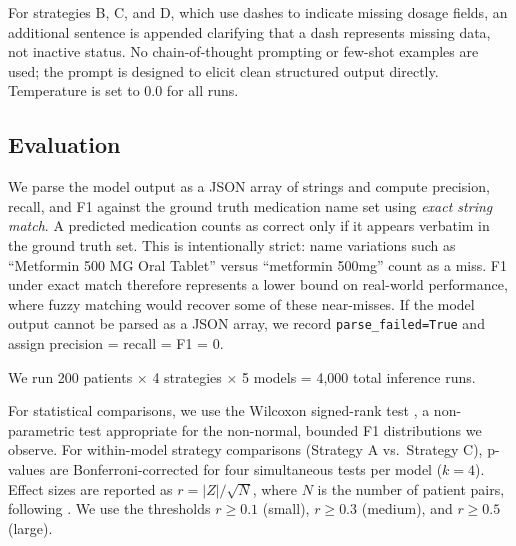 \noindent
For strategies B, C, and D, which use dashes to indicate missing dosage fields, an
additional sentence is appended clarifying that a dash represents missing data, not
inactive status. No chain-of-thought prompting or few-shot examples are used; the
prompt is designed to elicit clean structured output directly. Temperature is set to
0.0 for all runs.

\subsection{Evaluation}
\label{sec:evaluation}

We parse the model output as a JSON array of strings and compute precision,
recall, and F1 against the ground truth medication name set using \textit{exact
string match}. A predicted medication counts as correct only if it appears
verbatim in the ground truth set. This is intentionally strict: name variations
such as ``Metformin 500 MG Oral Tablet'' versus ``metformin 500mg'' count as a
miss. F1 under exact match therefore represents a lower bound on real-world
performance, where fuzzy matching would recover some of these near-misses.
If the model output cannot be parsed as a JSON array, we record
\texttt{parse\_failed=True} and assign precision = recall = F1 = 0.

We run 200 patients $\times$ 4 strategies $\times$ 5 models = 4,000 total
inference runs.

For statistical comparisons, we use the Wilcoxon signed-rank test
\citep{wilcoxon1945individual}, a non-parametric test appropriate for the
non-normal, bounded F1 distributions we observe. For within-model strategy
comparisons (Strategy A vs.\ Strategy C), p-values are Bonferroni-corrected
for four simultaneous tests per model ($k=4$). Effect sizes are reported as
$r = |Z| / \sqrt{N}$, where $N$ is the number of patient pairs, following
\citet{field2009discovering}. We use the thresholds $r \geq 0.1$ (small),
$r \geq 0.3$ (medium), and $r \geq 0.5$ (large).
